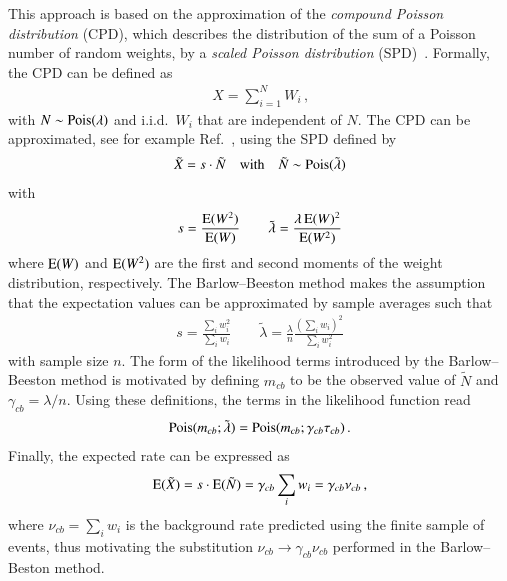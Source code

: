 This approach is based on the approximation of the \emph{compound Poisson
  distribution} (CPD), which describes the distribution of the sum of a Poisson
number of random weights, by a \emph{scaled Poisson distribution}
(SPD)~\cite{Bohm:2013gla}. Formally, the CPD can be defined as
\begin{align*}
  X = \sum_{i = 1}^{N} W_i \,\text{,}  %
\end{align*}
with $N \sim \operatorname{Pois}(\lambda)$ and i.i.d.\ $W_i$ that are independent of $N$. The
CPD can be approximated, see for example Ref.~\cite{Bohm:2013gla}, using the SPD
defined by
\begin{align*}
  \tilde{X} = s \cdot \tilde{N} \quad \text{with} \quad \tilde{N} \sim \operatorname{Pois}(\tilde{\lambda})
\end{align*}
with
\begin{align*}
  s = \frac{\operatorname{E}(W^2)}{\operatorname{E}(W)} \qquad \tilde{\lambda} = \frac{\lambda \operatorname{E}(W)^2}{\operatorname{E}(W^2)}
\end{align*}
where $\operatorname{E}(W)$ and $\operatorname{E}(W^2)$ are the first and second moments of the
weight distribution, respectively. The Barlow--Beeston method makes the
assumption that the expectation values can be approximated by sample averages
such that
\begin{align*}
  s = \frac{\sum_i w_i^2}{\sum_i w_i} \qquad \tilde{\lambda} = \frac{\lambda}{n} \frac{(\sum_i w_i)^2}{\sum_i w_i^2}
\end{align*}
with sample size $n$. The form of the likelihood terms introduced by the
Barlow--Beeston method is motivated by defining $m_{cb}$ to be the observed
value of $\tilde{N}$ and $\gamma_{cb} = \lambda / n$. Using these definitions,
the terms in the likelihood function read
\begin{align*}
  \operatorname{Pois}(m_{cb}; \tilde{\lambda}) = \operatorname{Pois}(m_{cb}; \gamma_{cb} \tau_{cb}) \,\text{.}
\end{align*}
Finally, the expected rate can be expressed as
\begin{align*}
  \operatorname{E}(\tilde{X}) = s \cdot \operatorname{E}(\tilde{N}) = \gamma_{cb} \sum_i w_i =
  \gamma_{cb} \nu_{cb} \,\text{,}
\end{align*}
where $\nu_{cb} = \sum_i w_i$ is the background rate predicted using the finite
sample of events, thus motivating the substitution
$\nu_{cb} \to \gamma_{cb} \nu_{cb}$ performed in the Barlow--Beston method.

